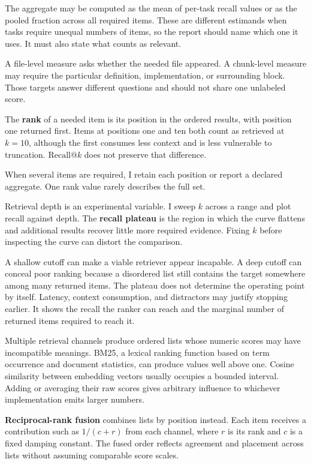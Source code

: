 The aggregate may be computed as the mean of per-task recall values or as the pooled fraction across all required items. These are different estimands when tasks require unequal numbers of items, so the report should name which one it uses. It must also state what counts as relevant.

A file-level measure asks whether the needed file appeared. A chunk-level measure may require the particular definition, implementation, or surrounding block. Those targets answer different questions and should not share one unlabeled score.

The \textbf{rank} of a needed item is its position in the ordered results, with position one returned first. Items at positions one and ten both count as retrieved at \(k = 10\), although the first consumes less context and is less vulnerable to truncation. \(\mathrm{Recall}@k\) does not preserve that difference.

When several items are required, I retain each position or report a declared aggregate. One rank value rarely describes the full set.

Retrieval depth is an experimental variable. I sweep \(k\) across a range and plot recall against depth. The \textbf{recall plateau} is the region in which the curve flattens and additional results recover little more required evidence. Fixing \(k\) before inspecting the curve can distort the comparison.

A shallow cutoff can make a viable retriever appear incapable. A deep cutoff can conceal poor ranking because a disordered list still contains the target somewhere among many returned items. The plateau does not determine the operating point by itself. Latency, context consumption, and distractors may justify stopping earlier. It shows the recall the ranker can reach and the marginal number of returned items required to reach it.

Multiple retrieval channels produce ordered lists whose numeric scores may have incompatible meanings. BM25, a lexical ranking function based on term occurrence and document statistics, can produce values well above one. Cosine similarity between embedding vectors usually occupies a bounded interval. Adding or averaging their raw scores gives arbitrary influence to whichever implementation emits larger numbers.

\textbf{Reciprocal-rank fusion} combines lists by position instead. Each item receives a contribution such as \(1/(c+r)\) from each channel, where \(r\) is its rank and \(c\) is a fixed damping constant. The fused order reflects agreement and placement across lists without assuming comparable score scales.

